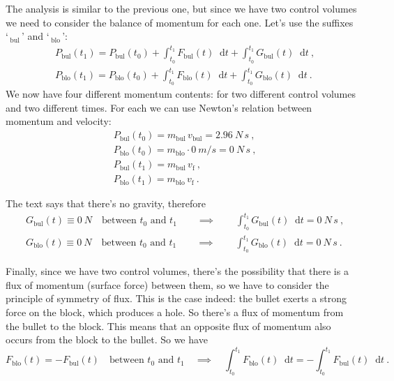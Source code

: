 \documentclass[a4paper,12pt,%
onecolumn,oneside,%
british%
]{memoir}
\newcommand*{\di}{\mathop{}\!\mathrm{d}}%
\renewcommand*{\|}[1][]{\nonscript\:#1\vert\nonscript\:\mathopen{}}
\newcommand*{\yti}{t_{0}}
\newcommand*{\ytf}{t_{1}}
\newcommand*{\dt}{\di t}
\newcommand*{\ym}{m}%
\begin{document}
The analysis is similar to the previous one, but since we have two control volumes we need to consider the balance of momentum for each one. Let's use the suffixes \enquote*{\,${}_{\textrm{bul}}$\,} and \enquote*{\,${}_{\textrm{blo}}$\,}:
\begin{equation*}
  \begin{aligned}
    &P_{\textrm{bul}}(\ytf) = P_{\textrm{bul}}(\yti)
    + \int_{\yti}^{\ytf}\!F_{\textrm{bul}}(t)\dt
    + \int_{\yti}^{\ytf}\!G_{\textrm{bul}}(t) \dt \ ,
    \\
    &P_{\textrm{blo}}(\ytf) = P_{\textrm{blo}}(\yti)
    + \int_{\yti}^{\ytf}\!F_{\textrm{blo}}(t)\dt
    + \int_{\yti}^{\ytf}\!G_{\textrm{blo}}(t) \dt \ .
\end{aligned}
\end{equation*}
We now have four different momentum contents: for two different control volumes and two different times. For each we can use Newton's relation between momentum and velocity:
\begin{equation*}
  \begin{aligned}
    &P_{\textrm{bul}}(\yti) = \ym_{\textrm{bul}}\, v_{\textrm{bul}}
    = \qty{2.96}{N\,s} \ ,
    \\
    &P_{\textrm{blo}}(\yti) = \ym_{\textrm{blo}}\cdot \qty{0}{m/s}
    = \qty{0}{N\,s} \ ,
    \\
    &P_{\textrm{bul}}(\ytf) = \ym_{\textrm{bul}}\, v_{\textrm{f}} \ ,
    \\
    &P_{\textrm{blo}}(\ytf) = \ym_{\textrm{blo}}\, v_{\textrm{f}} \ .
  \end{aligned}
\end{equation*}

The text says that there's no gravity, therefore
\begin{equation*}
  \begin{aligned}
    &G_{\textrm{bul}}(t) \equiv \qty{0}{N}\quad\text{between $\yti$ and $\ytf$}
    \qquad\implies\qquad
    \int_{\yti}^{\ytf}\!G_{\textrm{bul}}(t)\dt = \qty{0}{N\,s} \ ,
    \\
    &G_{\textrm{blo}}(t) \equiv \qty{0}{N}\quad\text{between $\yti$ and $\ytf$}
    \qquad\implies\qquad
    \int_{\yti}^{\ytf}\!G_{\textrm{blo}}(t)\dt = \qty{0}{N\,s} \ .
  \end{aligned}
\end{equation*}

Finally, since we have two control volumes, there's the possibility that there is a flux of momentum (surface force) between them, so we have to consider the principle of symmetry of flux. This is the case indeed: the bullet exerts a strong force on the block, which produces a hole. So there's a flux of momentum from the bullet to the block. This means that an opposite flux of momentum also occurs from the block to the bullet. So we have
\begin{equation*}
  F_{\textrm{blo}}(t) = -F_{\textrm{bul}}(t)
  \quad\text{between $\yti$ and $\ytf$}
    \quad\implies\quad
    \int_{\yti}^{\ytf}\!F_{\textrm{blo}}(t)\dt
    =
    -\int_{\yti}^{\ytf}\!F_{\textrm{bul}}(t)\dt  \ .
\end{equation*}
\end{document}
